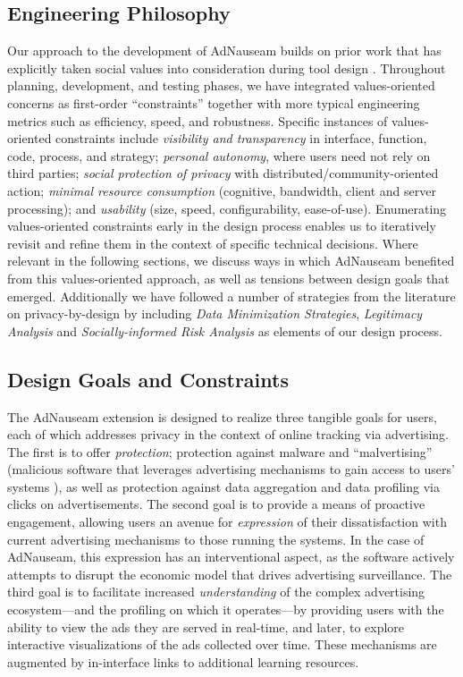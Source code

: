 \documentclass[conference]{IEEEtran}
\begin{document}
\subsection{Engineering Philosophy}

Our approach to the development of AdNauseam builds on prior work that has explicitly taken social values into consideration during tool design \cite{Friedman,Flanagan,Howe-1}. Throughout planning, development, and testing phases, we have integrated values-oriented concerns as first-order “constraints” together with more typical engineering metrics such as efficiency, speed, and robustness. Specific instances of values-oriented constraints include \emph{visibility and transparency} in interface, function, code, process, and strategy; \emph{personal autonomy}, where users need not rely on third parties; \emph{social protection of privacy} with distributed/community-oriented action; \emph{minimal resource consumption} (cognitive, bandwidth, client and server processing); and \emph{usability} (size, speed, configurability, ease-of-use). Enumerating values-oriented constraints early in the design process enables us to iteratively revisit and refine them in the context of specific technical decisions. Where relevant in the following sections, we discuss ways in which AdNauseam benefited from this values-oriented approach, as well as tensions between design goals that emerged. Additionally we have followed a number of strategies from the literature on privacy-by-design \cite{Gurses-0, Hoepman, Gurses-1, Hansen, Cavoukian} by including \emph{Data Minimization Strategies}, \emph{Legitimacy Analysis} and \emph{Socially-informed Risk Analysis} as elements of our design process.


\subsection{Design Goals and Constraints}

The AdNauseam extension is designed to realize three tangible goals for users, each of which addresses privacy in the context of online tracking via advertising. The first is to offer \emph{protection}; protection against malware and “malvertising” (malicious software that leverages advertising mechanisms to gain access to users' systems \cite{Mansfield}), as well as protection against data aggregation and data profiling via clicks on advertisements. The second goal is to provide a means of proactive engagement, allowing users an avenue for \emph{expression} of their dissatisfaction with current advertising mechanisms to those running the systems. In the case of AdNauseam, this expression has an interventional aspect, as the software actively attempts to disrupt the economic model that drives advertising surveillance. The third goal is to facilitate increased \emph{understanding} of the complex advertising ecosystem---and the profiling on which it operates---by providing users with the ability to view the ads they are served in real-time, and later, to explore interactive visualizations of the ads collected over time. These mechanisms are augmented by in-interface links to additional learning resources.
\end{document}
